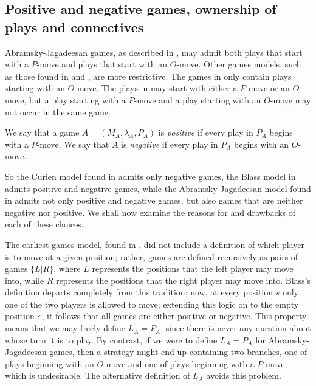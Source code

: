 \documentclass[11pt]{article} %
\begin{document}
\subsection{Positive and negative games, ownership of plays and connectives}

Abramsky-Jagadeesan games, as described in \cite{abramskyjagadeesangames}, may admit both plays that start with a $P$-move and plays that start with an $O$-move.  Other games models, such as those found in \cite{blassgames} and \cite{curiengames}, are more restrictive.  The games in \cite{curiengames} only contain plays starting with an $O$-move.  The plays in \cite{blassgames} may start with either a $P$-move or an $O$-move, but a play starting with a $P$-move and a play starting with an $O$-move may not occur in the same game.

\begin{definition}
  We say that a game $A=(M_A,\lambda_A,P_A)$ is \emph{positive} if every play in $P_A$ begins with a $P$-move.
  We say that $A$ is \emph{negative} if every play in $P_A$ begins with an $O$-move.
\end{definition}

So the Curien model found in \cite{curiengames} admits only negative games, the Blass model in \cite{blassgames} admits positive and negative games, while the Abramsky-Jagadeesan model found in \cite{abramskyjagadeesangames} admits not only positive and negative games, but also games that are neither negative nor positive.  We shall now examine the reasons for and drawbacks of each of these choices.

The earliest games model, found in \cite{conwaygames}, did not include a definition of which player is to move at a given position; rather, games are defined recursively as pairs of games $\{L|R\}$, where $L$ represents the positions that the left player may move into, while $R$ represents the positions that the right player may move into.  Blass's definition departs completely from this tradition; now, at every position $s$ only one of the two players is allowed to move; extending this logic on to the empty position $\epsilon$, it follows that all games are either positive or negative.  This property means that we may freely define $L_A=P_A$, since there is never any question about whose turn it is to play.  By contrast, if we were to define $L_A=P_A$ for Abramsky-Jagadeesan games, then a strategy might end up containing two branches, one of plays beginning with an $O$-move and one of plays beginning with a $P$-move, which is undesirable.  The alternative definition of $L_A$ avoids this problem.
\end{document}
